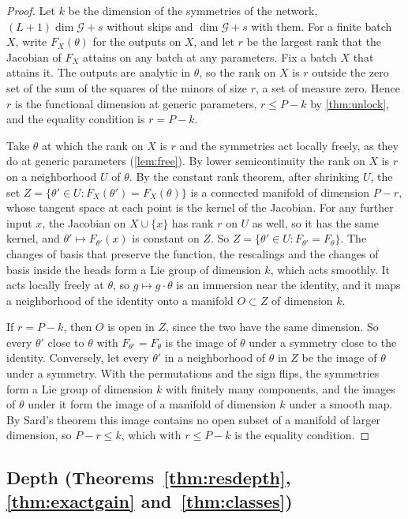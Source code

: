 \documentclass[10pt]{article}
\theoremstyle{definition}
\theoremstyle{remark}
\newcommand{\G}{\mathcal{G}}
\begin{document}
\begin{proof}
Let $k$ be the dimension of the symmetries of the network, $(L+1)\dim\G + s$ without skips and $\dim\G + s$ with them. For a finite batch $X$, write $F_X(\theta)$ for the outputs on $X$, and let $r$ be the largest rank that the Jacobian of $F_X$ attains on any batch at any parameters. Fix a batch $X$ that attains it. The outputs are analytic in $\theta$, so the rank on $X$ is $r$ outside the zero set of the sum of the squares of the minors of size $r$, a set of measure zero. Hence $r$ is the functional dimension at generic parameters, $r \le P - k$ by \cref{thm:unlock}, and the equality condition is $r = P - k$.

Take $\theta$ at which the rank on $X$ is $r$ and the symmetries act locally freely, as they do at generic parameters (\cref{lem:free}). By lower semicontinuity the rank on $X$ is $r$ on a neighborhood $U$ of $\theta$. By the constant rank theorem, after shrinking $U$, the set $Z = \{\theta' \in U : F_X(\theta') = F_X(\theta)\}$ is a connected manifold of dimension $P - r$, whose tangent space at each point is the kernel of the Jacobian. For any further input $x$, the Jacobian on $X \cup \{x\}$ has rank $r$ on $U$ as well, so it has the same kernel, and $\theta' \mapsto F_{\theta'}(x)$ is constant on $Z$. So $Z = \{\theta' \in U : F_{\theta'} = F_\theta\}$. The changes of basis that preserve the function, the rescalings and the changes of basis inside the heads form a Lie group of dimension $k$, which acts smoothly. It acts locally freely at $\theta$, so $g \mapsto g\cdot\theta$ is an immersion near the identity, and it maps a neighborhood of the identity onto a manifold $O \subset Z$ of dimension $k$.

If $r = P - k$, then $O$ is open in $Z$, since the two have the same dimension. So every $\theta'$ close to $\theta$ with $F_{\theta'} = F_\theta$ is the image of $\theta$ under a symmetry close to the identity. Conversely, let every $\theta'$ in a neighborhood of $\theta$ in $Z$ be the image of $\theta$ under a symmetry. With the permutations and the sign flips, the symmetries form a Lie group of dimension $k$ with finitely many components, and the images of $\theta$ under it form the image of a manifold of dimension $k$ under a smooth map. By Sard's theorem this image contains no open subset of a manifold of larger dimension, so $P - r \le k$, which with $r \le P - k$ is the equality condition.
\end{proof}


\subsection{Depth\texorpdfstring{ (Theorems~\ref*{thm:resdepth}, \ref*{thm:exactgain} and~\ref*{thm:classes})}{}}\label{app:depth}
\end{document}
